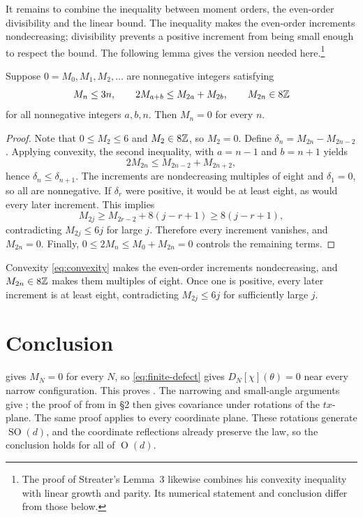 It remains to combine the inequality between moment orders, the
even-order divisibility and the linear bound. The inequality makes
the even-order increments nondecreasing; divisibility prevents a
positive increment from being small enough to respect the bound.
The following lemma gives the version needed here.\footnote{The proof
of Streater's Lemma~3 \cite[p.~114]{Streater} likewise combines his
convexity inequality with linear growth and parity. Its numerical
statement and conclusion differ from those below.}
\begin{lemma}\label{lem:integer}
Suppose $0=M_0,M_1,M_2,\dots$ are nonnegative integers satisfying
\begin{equation}
 M_n\leq3n,\qquad2M_{a+b}\leq M_{2a}+M_{2b},\qquad
 M_{2n}\in8\mathbb{Z}
\end{equation}
for all nonnegative integers $a,b,n$. Then $M_n=0$ for every $n$.
\end{lemma}
\begin{proof}
Note that $0\leq M_2\leq6$ and $M_2\in8\mathbb{Z}$, so $M_2=0$.
Define $\delta_n=M_{2n}-M_{2n-2}$. Applying convexity, the second inequality, with
$a=n-1$ and $b=n+1$ yields
\begin{equation}
 2M_{2n}\leq M_{2n-2}+M_{2n+2},
\end{equation}
hence $\delta_n\leq\delta_{n+1}$. The increments are nondecreasing
multiples of eight and $\delta_1=0$, so all are nonnegative. If
$\delta_r$ were positive, it would be at least eight, as would every
later increment. This implies
\begin{equation}
 M_{2j}\geq M_{2r-2}+8(j-r+1)\geq8(j-r+1),
\end{equation}
contradicting $M_{2j}\leq6j$ for large $j$. Therefore every increment
vanishes, and $M_{2n}=0$. Finally,
$0\leq2M_n\leq M_0+M_{2n}=0$ controls the remaining terms.
\end{proof}

\begin{remark*}
Convexity \eqref{eq:convexity} makes the even-order increments
nondecreasing, and $M_{2n}\in8\mathbb{Z}$ makes them multiples of eight.
Once one is positive, every later increment is at least eight,
contradicting $M_{2j}\leq6j$ for sufficiently large $j$.
\end{remark*}

\section{Conclusion}

 gives $M_N=0$ for every $N$, so
\eqref{eq:finite-defect} gives $D_N[\chi](\theta)=0$ near every narrow
configuration. This proves . The narrowing and small-angle
arguments give ; the proof of  from
 in \S2 then gives covariance under rotations of the
$tx$-plane.
The same proof applies to every coordinate plane. These rotations
generate $\operatorname{SO}(d)$, and the coordinate reflections
already preserve the law, so the conclusion holds for all of
$\operatorname{O}(d)$.

